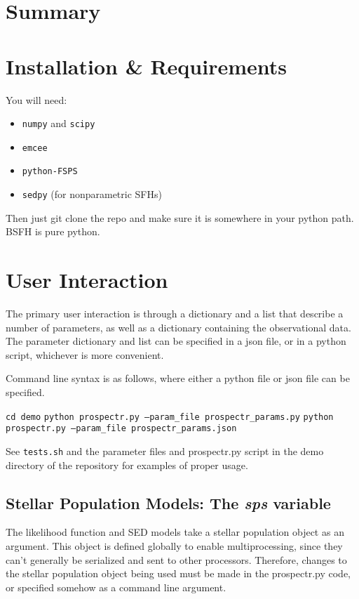 

\section{Summary}

\section{Installation \& Requirements}
You will need:

\begin{itemize}
\item \texttt{numpy} and \texttt{scipy}
\item \texttt{emcee}
\item \texttt{python-FSPS}
\item \texttt{sedpy} (for nonparametric SFHs)
\end{itemize}

Then just git clone the repo and make sure it is somewhere in your
python path.  BSFH is pure python.

\section{User Interaction}
The primary user interaction is through a dictionary and a list that
describe a number of parameters, as well as a dictionary containing
the observational data.  The parameter dictionary and list can be
specified in a json file, or in a python script, whichever is more
convenient.

Command line syntax is as follows, where either a python file or json
file can be specified.
\begin{center}
\texttt{cd demo}
\texttt{python prospectr.py --param_file prospectr_params.py}
\texttt{python prospectr.py --param_file prospectr_params.json}
\end{center}

See \texttt{tests.sh} and the parameter files and prospectr.py script
in the demo directory of the repository for examples of proper usage.

\subsection{Stellar Population Models: The \emph{sps} variable}
The likelihood function and SED models take a stellar population
object as an argument.  This object is defined globally to enable
multiprocessing, since they can't generally be serialized and sent to
other processors.  Therefore, changes to the stellar population object
being used must be made in the prospectr.py code, or specified somehow
as a command line argument.

